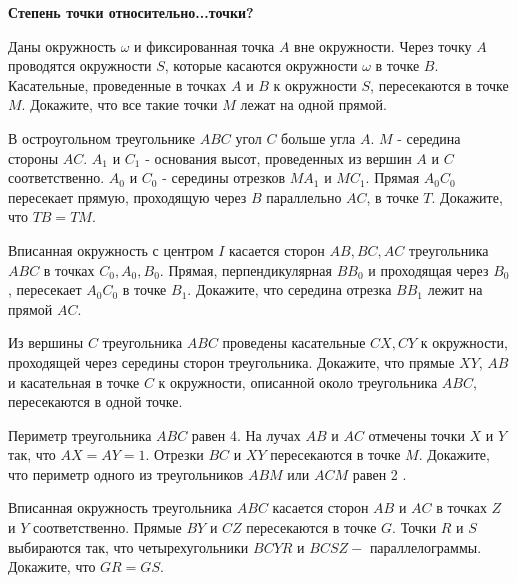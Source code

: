 \centerline{\bf \Huge Степень точки относительно...точки?}
\centerline{\bf \Huge }

\begin{flushright}
        \scriptsize{}
\end{flushright}


 Даны окружность $\omega$ и фиксированная точка $A$ вне окружности. Через точку $A$ проводятся окружности $S$, которые касаются окружности $\omega$ в точке $B$. Касательные, проведенные в точках $A$ и $B$ к окружности $S$, пересекаются в точке $M$. Докажите, что все такие точки $M$ лежат на одной прямой.

 В остроугольном треугольнике $A B C$ угол $C$ больше угла $A$. $M$ - середина стороны $A C$. $A_1$ и $C_1$ - основания высот, проведенных из вершин $A$ и $C$ соответственно. $A_0$ и $C_0$ - середины отрезков $M A_1$ и $M C_1$. Прямая $A_0 C_0$ пересекает прямую, проходящую через $B$ параллельно $A C$, в точке $T$. Докажите, что $T B=T M$.

 Вписанная окружность с центром $I$ касается сторон $A B, B C, A C$ треугольника $A B C$ в точках $C_0, A_0, B_0$. Прямая, перпендикулярная $B B_0$ и проходящая через $B_0$, пересекает $A_0 C_0$ в точке $B_1$. Докажите, что середина отрезка $B B_1$ лежит на прямой $A C$.

 Из вершины $C$ треугольника $A B C$ проведены касательные $C X, C Y$ к окружности, проходящей через середины сторон треугольника. Докажите, что прямые $X Y$, $A B$ и касательная в точке $C$ к окружности, описанной около треугольника $A B C$, пересекаются в одной точке.

Периметр треугольника $A B C$ равен 4. На лучах $A B$ и $A C$ отмечены точки $X$ и $Y$ так, что $A X=A Y=1$. Отрезки $B C$ и $X Y$ пересекаются в точке $M$. Докажите, что периметр одного из треугольников $A B M$ или $A C M$ равен 2 .

Вписанная окружность треугольника $A B C$ касается сторон $A B$ и $A C$ в точках $Z$ и $Y$ соответственно. Прямые $B Y$ и $C Z$ пересекаются в точке $G$. Точки $R$ и $S$ выбираются так, что четырехугольники $B C Y R$ и $B C S Z-$ параллелограммы. Докажите, что $G R=G S$.


